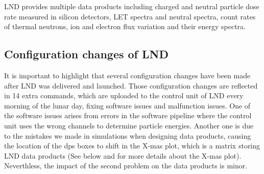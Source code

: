 \ac{LND} provides multiple data products including charged and neutral particle dose rate measured in silicon detectors, \ac{LET} spectra and neutral spectra, count rates of thermal neutrons, ion and electron flux variation and their energy spectra.


\subsection*{Configuration changes of LND}
\label{sec:configuration_changes}
It is important to highlight that several configuration changes have been made after \ac{LND} was delivered and launched. Those configuration changes are reflected in 14 extra commands, which are uploaded to the control unit of \ac{LND} every morning of the lunar day, fixing software issues and malfunction issues. One of the software issues arises from errors in the software pipeline where the control unit uses the wrong channels to determine particle energies. Another one is due to the mistakes we made in simulations when designing data products, causing the location of the \ac{dps} boxes to shift in the X-mas plot, which is a matrix storing \ac{LND} data products (See below and \citet{Wimmer2020SSRv} for more details about the X-mas plot). Neverthless, the impact of the second problem on the data products is minor. 

